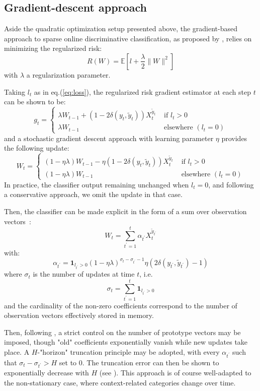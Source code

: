 \documentclass[preprint,12pt,authoryear]{elsarticle}
\begin{document}

\subsection{Gradient-descent approach}

Aside the quadratic optimization setup presented above, the gradient-based approach to sparse online discriminative classification, as proposed by \cite{kivinen2004online}, relies on minimizing the regularized risk:
$$R(W) = \mathbb{E}\left[ l + \frac{\lambda}{2}\|W\|^2\right]$$
with $\lambda$ a regularization parameter.

Taking $l_t$ as in eq.(\ref{eq:loss}), the regularized risk gradient estimator at each step $t$ can be shown to be:
$$g_t = \left\{
\begin{array}{ll}
\lambda W_{t-1} + (1 - 2 \delta(y_t,\tilde{y}_t)) X_t^{\tilde{y}_t} &\text{ if } l_t > 0\\
\lambda W_{t-1} &\text{ elsewhere }(l_t=0)
\end{array}
\right.$$
and a stochastic gradient descent approach with learning parameter $\eta$ provides the following update:
$$W_t =  \left\{
\begin{array}{ll}
(1-\eta\lambda) W_{t-1} - \eta (1 - 2 \delta(y_t,\tilde{y}_t)) X_t^{\tilde{y}_t} &\text{ if } l_t > 0\\
(1-\eta\lambda) W_{t-1} &\text{ elsewhere }(l_t = 0)
\end{array}
\right.$$
In practice, the classifier output remaining unchanged when $l_t = 0$, and following a conservative approach, we omit the update in that case. 

Then, the classifier can be made explicit in the form of a sum over observation vectors~:
$$W_t = \sum_{t^\prime=1}^t \alpha_{t^\prime} X_t^{\tilde{y}_{t^\prime}}$$
with:
$$\alpha_{t^\prime} = \mathbf{1}_{l_{t^\prime} > 0}(1 - \eta \lambda)^{\sigma_t - \sigma_{t^\prime}-1}  \eta (2\delta(y_{t^\prime},\tilde{y}_{t^\prime})-1)$$
where $\sigma_t$ is the number of updates at time $t$, i.e.
$$\sigma_t = \sum_{t^\prime=1}^t \mathbf{1}_{l_{t^\prime} > 0}$$  
and the cardinality of the non-zero coefficients correspond to the number of observation vectors effectively stored in memory.

Then, following \cite{kivinen2004online}, a strict control on the number of prototype vectors may be imposed, though "old" coefficients exponentially vanish while new updates take place. A $H$-"horizon" truncation principle may be adopted, with every $\alpha_{t^\prime}$ such that $\sigma_t - \sigma_{t^\prime} > H$ set to 0. The truncation error can then be shown to  exponentially decrease with $H$ (see \cite{kivinen2004online}). This approach is of course well-adapted to the non-stationary case, where context-related categories change over time.
\end{document}

